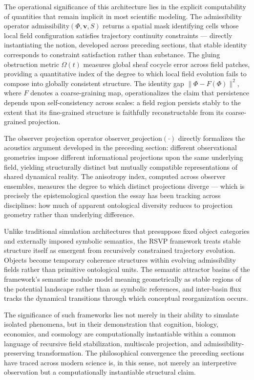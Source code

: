 \documentclass[12pt,a4paper]{article}
\begin{document}
The operational significance of this architecture lies in the explicit computability
of quantities that remain implicit in most scientific modeling. The admissibility
operator $\mathrm{admissibility}(\Phi, \mathbf{v}, S)$ returns a spatial mask
identifying cells whose local field configuration satisfies trajectory continuity
constraints --- directly instantiating the notion, developed across preceding sections,
that stable identity corresponds to constraint satisfaction rather than substance. The
gluing obstruction metric $\Omega(t)$ measures global sheaf cocycle error across field
patches, providing a quantitative index of the degree to which local field evolution
fails to compose into globally consistent structure. The identity gap
$\|\Phi - F(\Phi)\|^2$, where $F$ denotes a coarse-graining map, operationalizes the
claim that persistence depends upon self-consistency across scales: a field region
persists stably to the extent that its fine-grained structure is faithfully
reconstructable from its coarse-grained projection.

The observer projection operator $\mathrm{observer\_projection}(\cdot)$ directly
formalizes the acoustics argument developed in the preceding section: different
observational geometries impose different informational projections upon the same
underlying field, yielding structurally distinct but mutually compatible representations
of shared dynamical reality. The anisotropy index, computed across observer ensembles,
measures the degree to which distinct projections diverge --- which is precisely the
epistemological question the essay has been tracking across disciplines: how much of
apparent ontological diversity reduces to projection geometry rather than underlying
difference.

Unlike traditional simulation architectures that presuppose fixed object categories
and externally imposed symbolic semantics, the RSVP framework treats stable structure
itself as emergent from recursively constrained trajectory evolution. Objects become
temporary coherence structures within evolving admissibility fields rather than
primitive ontological units. The semantic attractor basins of the framework's semantic
module model meaning geometrically as stable regions of the potential landscape rather
than as symbolic references, and inter-basin flux tracks the dynamical transitions
through which conceptual reorganization occurs.

The significance of such frameworks lies not merely in their ability to simulate
isolated phenomena, but in their demonstration that cognition, biology, economics,
and cosmology are computationally instantiable within a common language of recursive
field stabilization, multiscale projection, and admissibility-preserving transformation.
The philosophical convergence the preceding sections have traced across modern science
is, in this sense, not merely an interpretive observation but a computationally
instantiable structural claim.
\end{document}
